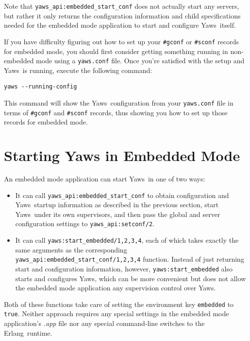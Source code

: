 \documentclass[11pt,oneside,english]{book}
\newcommand{\Erlang}            %
        {{\sc Erlang}}
\newcommand{\Yaws}            %
        {{\sc Yaws}}
\begin{document}
Note that \verb+yaws_api:embedded_start_conf+ does not actually start
any servers, but rather it only returns the configuration information
and child specifications needed for the embedded mode application to
start and configure \Yaws\  itself.

If you have difficulty figuring out how to set up your \verb+#gconf+
or \verb+#sconf+ records for embedded mode, you should first consider
getting something running in non-embedded mode using a
\verb+yaws.conf+ file. Once you're satisfied with the setup and
\Yaws\  is running, execute the following command:

\begin{verbatim}
yaws --running-config
\end{verbatim}

This command will show the \Yaws\ configuration from your
\verb+yaws.conf+ file in terms of \verb+#gconf+ and \verb+#sconf+
records, thus showing you how to set up those records for embedded
mode.

\section{Starting Yaws in Embedded Mode}

An embedded mode application can start \Yaws\  in one of two ways:

\begin{itemize}

\item It can call \verb+yaws_api:embedded_start_conf+ to obtain
  configuration and \Yaws\  startup information as described in the
  previous section, start \Yaws\  under its own supervisors, and then
  pass the global and server configuration settings to
  \verb+yaws_api:setconf/2+.

\item It can call \verb+yaws:start_embedded/1,2,3,4+, each of which
  takes exactly the same arguments as the corresponding
  \verb+yaws_api:embedded_start_conf/1,2,3,4+ function. Instead of just
  returning start and configuration information, however,
  \verb+yaws:start_embedded+ also starts and configures \Yaws{}, which
  can be more convenient but does not allow the embedded mode
  application any supervision control over \Yaws{}.

\end{itemize}

Both of these functions take care of setting the environment key
\verb+embedded+ to \verb+true+. Neither approach requires any special
settings in the embedded mode application's \textit{.app} file nor any
special command-line switches to the \Erlang\  runtime.
\end{document}
